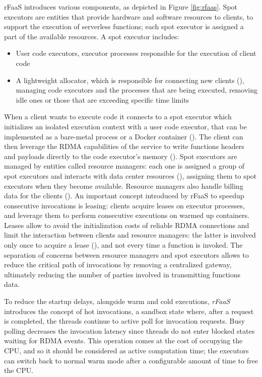 \documentclass[
	a4paper, %
	12pt,
	twoside, %
]{LTJournalArticle}
\DeclareRobustCommand*\circledColorSmall[2]{\tikz[baseline=(char.base)]{
    \node[shape=circle,fill=#2,draw=#2,inner sep=0pt] (char) {\textcolor{white}{\footnotesize\textbf{#1}}};}}
\begin{document}
rFaaS introduces various components, as depicted in Figure \ref{fig:rfaas}. Spot executors are entities that provide hardware and software resources to clients, to support the execution of serverless functions; each spot executor is assigned a part of the available resources.
A spot executor includes:
\begin{itemize}
	\item User code executors, executor processes responsible for the execution of client code
	\item A lightweight allocator, which is responsible for connecting new clients (\circledColorSmall{A2}{brown}), managing code executors and the processes that are being executed, removing idle ones or those that are exceeding specific time limits
\end{itemize}
When a client wants to execute code it connects to a spot executor which initializes an isolated execution context with a user code executor, that can be implemented as a bare-metal process or a Docker container (\circledColorSmall{D1}{brown}). The client can then leverage the RDMA capabilities of the service to write functions headers and payloads directly to the code executor's memory (\circledColorSmall{D2}{brown}). Spot executors are managed by entities called resource managers: each one is assigned a group of spot executors and interacts with data center resources (\circledColorSmall{C}{brown}), assigning them to spot executors when they become available. Resource managers also handle billing data for the clients (\circledColorSmall{B}{brown}). An important concept introduced by rFaaS to speedup consecutive invocations is leasing: clients acquire leases on executor processes, and leverage them to perform consecutive executions on warmed up containers. Leases allow to avoid the initialization costs of reliable RDMA connections and limit the interaction between clients and resource managers: the latter is involved only once to acquire a lease (\circledColorSmall{A1}{brown}), and not every time a function is invoked. The separation of concerns between resource managers and spot executors allows to reduce the critical path of invocations by removing a centralized gateway, ultimately reducing the number of parties involved in transmitting functions data. 

To reduce the startup delays, alongside warm and cold executions, \textit{rFaaS} introduces the concept of hot invocations, a sandbox state where, after a request is completed, the threads continue to active poll for invocation requests. Busy polling decreases the invocation latency since threads do not enter blocked states waiting for RDMA events. This operation comes at the cost of occupying the CPU, and so it should be considered as active computation time; the executors can switch back to normal warm mode after a configurable amount of time to free the CPU. 
\end{document}
